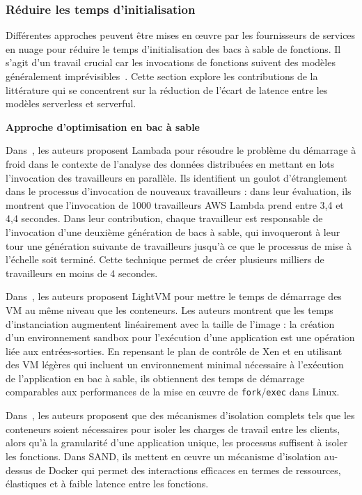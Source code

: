 \subsubsection{Réduire les temps d'initialisation}

Différentes approches peuvent être mises en œuvre par les fournisseurs de services en nuage pour réduire le temps d'initialisation des bacs à sable de fonctions. Il s'agit d'un travail crucial car les invocations de fonctions suivent des modèles généralement imprévisibles~\cite{shahradServerlessWildCharacterizing}. Cette section explore les contributions de la littérature qui se concentrent sur la réduction de l'écart de latence entre les modèles serverless et serverful.

\textbf{Approche d'optimisation en bac à sable}

Dans~\cite{mullerLambadaInteractiveData2020}, les auteurs proposent Lambada pour résoudre le problème du démarrage à froid dans le contexte de l'analyse des données distribuées en mettant en lots l'invocation des travailleurs en parallèle. Ils identifient un goulot d'étranglement dans le processus d'invocation de nouveaux travailleurs : dans leur évaluation, ils montrent que l'invocation de 1000 travailleurs AWS Lambda prend entre 3,4 et 4,4 secondes. Dans leur contribution, chaque travailleur est responsable de l'invocation d'une deuxième génération de bacs à sable, qui invoqueront à leur tour une génération suivante de travailleurs jusqu'à ce que le processus de mise à l'échelle soit terminé. Cette technique permet de créer plusieurs milliers de travailleurs en moins de 4 secondes.

Dans~\cite{mancoMyVMLighter2017}, les auteurs proposent LightVM pour mettre le temps de démarrage des VM au même niveau que les conteneurs. Les auteurs montrent que les temps d'instanciation augmentent linéairement avec la taille de l'image : la création d'un environnement sandbox pour l'exécution d'une application est une opération liée aux entrées-sorties. En repensant le plan de contrôle de Xen et en utilisant des VM légères qui incluent un environnement minimal nécessaire à l'exécution de l'application en bac à sable, ils obtiennent des temps de démarrage comparables aux performances de la mise en œuvre de \texttt{fork}/\texttt{exec} dans Linux.

Dans~\cite{akkusSANDHighPerformanceServerless}, les auteurs proposent que des mécanismes d'isolation complets tels que les conteneurs soient nécessaires pour isoler les charges de travail entre les clients, alors qu'à la granularité d'une application unique, les processus suffisent à isoler les fonctions. Dans SAND, ils mettent en œuvre un mécanisme d'isolation au-dessus de Docker qui permet des interactions efficaces en termes de ressources, élastiques et à faible latence entre les fonctions.


